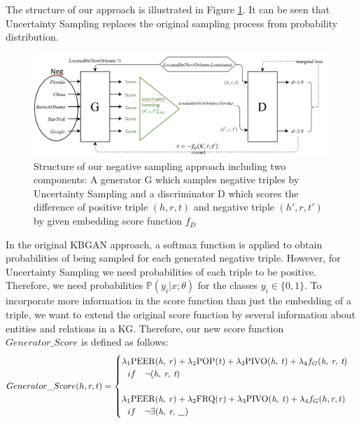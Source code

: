The structure of our approach is illustrated in Figure \ref{fig:architecture}.
It can be seen that Uncertainty Sampling replaces the original sampling process from probability distribution.
\begin{figure}
    \centering
    \includegraphics[width=\textwidth]{figures/architecture.png}
    \caption{Structure of our negative sampling approach including two components:
    A generator G which samples negative triples by Uncertainty Sampling and a discriminator D which scores the difference of positive triple $(h,r,t)$ and negative triple $(h',r,t')$ by given embedding score function $f_D$}
    \label{fig:architecture}
\end{figure}
In the original \ac{KBGAN} approach, a softmax function is applied to obtain probabilities of being sampled for each generated negative triple.
However, for Uncertainty Sampling we need probabilities of each triple to be positive. 
Therefore, we need probabilities $\mathds{P}(y_i | x; \theta)$ for the classes $y_i \in \{0, 1\}$.
To incorporate more information in the score function than just the embedding of a triple, we want to extend the original score function by several information about entities and relations in a \ac{KG}.
Therefore, our new score function $Generator\_Score$ is defined as follows:
\begin{equation}
    Generator\_Score(h, r, t)=
    \begin{cases}
         \lambda_1 \text{PEER(\textit{h, r})} + \lambda_2 \text{POP(\textit{t})} + \lambda_3 \text{PIVO(\textit{h, t})} + \lambda_4 f_G(\textit{h, r, t})
         \\ \ \ 
         if\ \ \ \neg(\textit{h, r, t})
         \\ \\
         \lambda_1 \text{PEER(\textit{h, r})} + \lambda_2 \text{FRQ(\textit{r})} + \lambda_3 \text{PIVO(\textit{h, t})} + \lambda_4 f_G(h, r, t)
         \\ \ \ 
         if\ \ \ \neg \exists (\textit{h, r, \_})
         \\
    \end{cases}
\end{equation}
